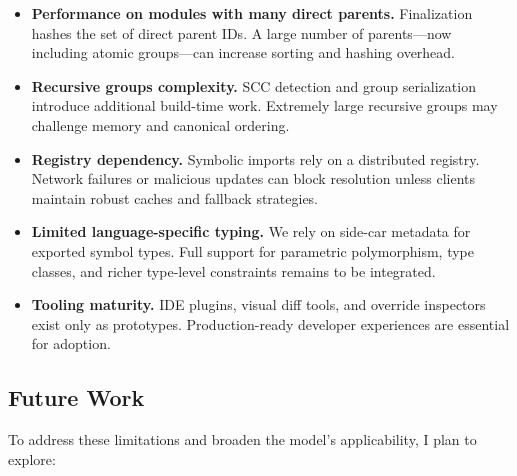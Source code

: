 \documentclass[sigplan,screen]{acmart}
\begin{document}
\begin{itemize}
	\item \textbf{Performance on modules with many direct parents.} 
	Finalization hashes the set of direct parent IDs. A large number of parents—now including atomic groups—can increase sorting and hashing overhead.
	\item \textbf{Recursive groups complexity.} 
	SCC detection and group serialization introduce additional build-time work. Extremely large recursive groups may challenge memory and canonical ordering.
	\item \textbf{Registry dependency.} 
	Symbolic imports rely on a distributed registry. Network failures or malicious updates can block resolution unless clients maintain robust caches and fallback strategies.
	\item \textbf{Limited language-specific typing.} 
	We rely on side-car metadata for exported symbol types. Full support for parametric polymorphism, type class\-es, and richer type-level constraints remains to be integrated.
	\item \textbf{Tooling maturity.} 
	IDE plugins, visual diff tools, and override inspectors exist only as prototypes. Production-ready developer experiences are essential for adoption.
\end{itemize}

\subsection{Future Work}

To address these limitations and broaden the model's applicability, I plan to explore:
\end{document}
